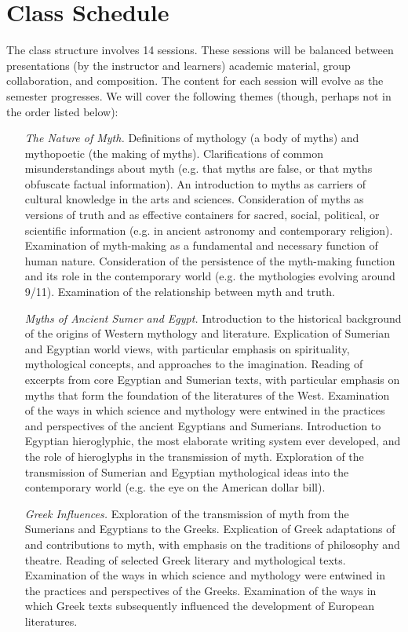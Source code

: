 \documentclass[10pt,DIV09,letterpaper,oneside,headsepline]{scrreprt}
\begin{document}
\section{Class Schedule}
The class structure involves 14 sessions. These sessions will be
balanced between presentations (by the instructor and learners)
academic material, group collaboration, and composition. The content
for each session will evolve as the semester progresses. We will cover
the following themes (though, perhaps not in the order listed below):
\\
\begin{itemize}

\item [\textit{The Nature of Myth.}] Definitions of mythology (a body of myths) and mythopoetic (the making of myths). Clarifications of common misunderstandings about myth (e.g. that myths are false, or that myths obfuscate factual information). An introduction to myths as carriers of cultural knowledge in the arts and sciences. Consideration of myths as versions of truth and as effective containers for sacred, social, political, or scientific information (e.g. in ancient astronomy and contemporary religion). Examination of myth-making as a fundamental and necessary function of human nature. Consideration of the persistence of the myth-making function and its role in the contemporary world (e.g. the mythologies evolving around 9/11).
Examination of the relationship between myth and truth.

\item [\textit{Myths of Ancient Sumer and Egypt.}] Introduction to the historical background of the origins of Western mythology and literature. Explication of Sumerian and Egyptian world views, with particular emphasis on spirituality, mythological concepts, and approaches to the imagination. Reading of excerpts from core Egyptian and Sumerian texts, with particular emphasis on myths that form the foundation of the literatures of the West. Examination of the ways in which science and mythology were entwined in the practices and perspectives of the ancient Egyptians and Sumerians. Introduction to Egyptian hieroglyphic, the most elaborate writing system ever developed, and the role of hieroglyphs in the transmission of myth. Exploration of the transmission of Sumerian and Egyptian mythological ideas into the contemporary world (e.g. the eye on the American dollar bill).

\item [\textit{Greek Influences.}] Exploration of the transmission of myth from the Sumerians and Egyptians to the Greeks. Explication of Greek adaptations of and contributions to myth, with emphasis on the traditions of philosophy and theatre. Reading of selected Greek literary and mythological texts. Examination of the ways in which science and mythology were entwined in the practices and perspectives of the Greeks. Examination of the ways in which Greek texts subsequently influenced the development of European literatures.


\end{itemize}
\end{document}
